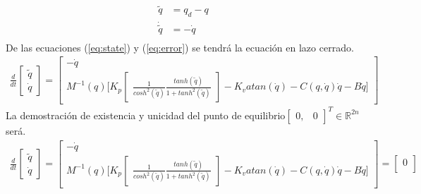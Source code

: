 \documentclass[12pt]{article}
\begin{document}
\begin{enumerate}
\begin{equation}
\begin{split}
            \tilde{q}&=q_d-q\\
            \dot{\tilde{q}}&=-\dot{q}\\
        \end{split}
        \label{eq:error}
    \end{equation}
    De las ecuaciones (\ref{eq:state}) y (\ref{eq:error}) se tendrá la ecuación en lazo cerrado.
    \begin{equation}
        \begin{split}
            \frac{d}{dt}\begin{bmatrix}
                \tilde{q}\\
                \dot{q}
            \end{bmatrix}=\begin{bmatrix}
                -\dot{q}\\
                M^{-1}(q)\lbrack K_p
            \begin{bmatrix}
                \frac{1}{cosh^2(\tilde{q})}\frac{tanh(\tilde{q})}{1+tanh^2(\tilde{q})}
            \end{bmatrix}
            -K_vatan(\dot{q})-C(q,\dot{q})\dot{q}-B\dot{q}\rbrack
            \end{bmatrix}
        \end{split}
        \label{eq:closed_matrix}
    \end{equation}
    La demostración de existencia y unicidad del punto de equilibrio$\begin{bmatrix}
        0,&0
    \end{bmatrix}^T \in  \mathbb{R}^{2n} $ será.
    \begin{equation}
        \begin{split}
            \frac{d}{dt}\begin{bmatrix}
                \tilde{q}\\
                \dot{q}
            \end{bmatrix}=\begin{bmatrix}
                -\dot{q}\\
                M^{-1}(q)\lbrack K_p
            \begin{bmatrix}
                \frac{1}{cosh^2(\tilde{q})}\frac{tanh(\tilde{q})}{1+tanh^2(\tilde{q})}
            \end{bmatrix}
            -K_vatan(\dot{q})-C(q,\dot{q})\dot{q}-B\dot{q}\rbrack
            \end{bmatrix}=\begin{bmatrix}
                0\\

\end{bmatrix}
\end{split}
\end{equation}
\end{enumerate}
\end{document}
